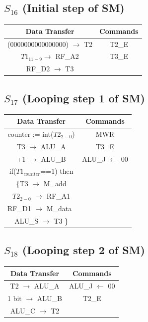 \documentclass[]{report}
\begin{document}
            \subsection*{$S_{16}$ (Initial step of SM)} %
            \begin{center}
                \begin{tabular}{|c|c|}
                    \hline
                    Data Transfer & Commands \\
                    \hline
                    (0000000000000000) $\to$ T2 & T2\_E\\
                    $T1_{11-9} \to$ RF\_A2 & T3\_E\\
                    RF\_D2 $\to$ T3 & \\
                    \hline
                \end{tabular}
            \end{center}            
            \subsection*{$S_{17}$ (Looping step 1 of SM)} %
            \begin{center}
                \begin{tabular}{|c|c|}
                    \hline
                    Data Transfer & Commands \\
                    \hline
                    counter := int($T2_{2-0}$) & MWR\\
                    T3 $\to$ ALU\_A & T3\_E\\
                    +1 $\to$ ALU\_B & ALU\_J $\leftarrow$ 00\\
                    if($T1_{counter}$==1) then & \\
                    \{T3 $\to$ M\_add& \\
                    $T2_{2-0}$ $\to$ RF\_A1 & \\
                    RF\_D1 $\to$ M\_data\ & \\
                    ALU\_S $\to$ T3 \} & \\ 
                    \hline
                \end{tabular}
            \end{center} 
            \subsection*{$S_{18}$ (Looping step 2 of SM)} %
            \begin{center}
                \begin{tabular}{|c|c|}
                    \hline
                    Data Transfer & Commands \\
                    \hline
                    T2 $\to$ ALU\_A & ALU\_J $\leftarrow$ 00\\
                    1 bit $\to$ ALU\_B & T2\_E\\
                    ALU\_C $\to$ T2 & \\
                    \hline
                \end{tabular}
            \end{center} 
\end{document}
